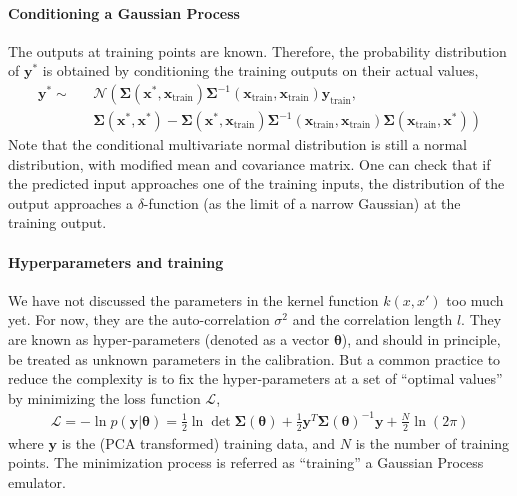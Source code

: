 \paragraph{Conditioning a Gaussian Process} The outputs at training points are known.
Therefore, the probability distribution of $\mathbf{y}^*$ is obtained by conditioning the training outputs on their actual values,
\begin{eqnarray}
\mathbf{y}^* \sim &&\mathcal{N}\left(
\mathbf{\Sigma}(\mathbf{x}^*, \mathbf{x}_{\textrm{train}} )
\mathbf{\Sigma}^{-1}(\mathbf{x}_{\textrm{train}}, \mathbf{x}_{\textrm{train}} )\mathbf{y}_{\textrm{train}},\right.\\\nonumber
&&\left.
\mathbf{\Sigma}(\mathbf{x}^*, \mathbf{x}^*) - 
\mathbf{\Sigma}(\mathbf{x}^*, \mathbf{x}_{\textrm{train}} )
\mathbf{\Sigma}^{-1}(\mathbf{x}_{\textrm{train}}, \mathbf{x}_{\textrm{train}} )
\mathbf{\Sigma}(\mathbf{x}_{\textrm{train}},\mathbf{x}^*)
\right)
\end{eqnarray}
Note that the conditional multivariate normal distribution is still a normal distribution, with modified mean and covariance matrix.
One can check that if the predicted input approaches one of the training inputs, the distribution of the output approaches a $\delta$-function (as the limit of a narrow Gaussian) at the training output.

\paragraph{Hyperparameters and training} We have not discussed the parameters in the kernel function $k(x, x')$ too much yet.
For now, they are the auto-correlation $\sigma^2$ and the correlation length $l$. 
They are known as hyper-parameters (denoted as a vector $\mathbf{\theta}$), and should in principle, be treated as unknown parameters in the calibration.
But a common practice to reduce the complexity is to fix the hyper-parameters at a set of ``optimal values'' by minimizing the loss function $\mathcal{L}$,
\begin{eqnarray}
\mathcal{L} = -\ln p(\mathbf{y}|\mathbf{\theta}) = \frac{1}{2}\ln \det \mathbf{\Sigma}(\mathbf{\theta})  + \frac{1}{2}\mathbf{y}^T \mathbf{\Sigma}(\mathbf{\theta})^{-1} \mathbf{y} + \frac{N}{2}\ln(2\pi)
\end{eqnarray}
where $\mathbf{y}$ is the (PCA transformed) training data, and $N$ is the number of training points.
The minimization process is referred as ``training'' a Gaussian Process emulator.

